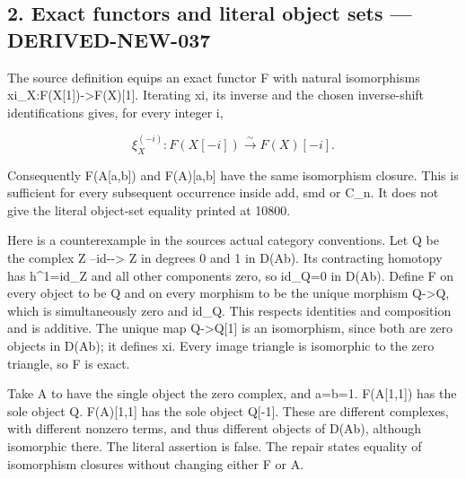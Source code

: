\subsection{2. Exact functors and literal object sets --- DERIVED-NEW-037}\label{proofs-10691-11108-exact-functors-and-literal-object-sets-derived-new-037}

The source definition equips an exact functor F with natural isomorphisms xi\_\allowbreak{}X:\allowbreak{}F(X[1]\allowbreak{})\allowbreak{}\allowbreak{}->F(X)\allowbreak{}[1]\allowbreak{}. Iterating xi,\allowbreak{} its inverse and the chosen inverse-shift identifications gives,\allowbreak{} for every integer i,\allowbreak{}

\[
 \xi_X^{(-i)}:F(X[-i])\xrightarrow{\sim}F(X)[-i].
\]

Consequently F(A[a,\allowbreak{}b]\allowbreak{})\allowbreak{} and F(A)\allowbreak{}[a,\allowbreak{}b]\allowbreak{} have the same isomorphism closure. This is sufficient for every subsequent occurrence inside add,\allowbreak{} smd or C\_\allowbreak{}n. It does not give the literal object-set equality printed at 10800.

Here is a counterexample in the source\textquotesingle s actual category conventions. Let Q be the complex Z --id-\allowbreak{}-> Z in degrees 0 and 1 in D(Ab)\allowbreak{}. Its contracting homotopy has h\textasciicircum{}1\allowbreak{}=id\_\allowbreak{}Z and all other components zero,\allowbreak{} so id\_\allowbreak{}Q\allowbreak{}=0 in D(Ab)\allowbreak{}. Define F on every object to be Q and on every morphism to be the unique morphism Q\allowbreak{}->Q,\allowbreak{} which is simultaneously zero and id\_\allowbreak{}Q. This respects identities and composition and is additive. The unique map Q\allowbreak{}->Q[1]\allowbreak{} is an isomorphism,\allowbreak{} since both are zero objects in D(Ab)\allowbreak{}; it defines xi. Every image triangle is isomorphic to the zero triangle,\allowbreak{} so F is exact.

Take A to have the single object the zero complex,\allowbreak{} and a\allowbreak{}=b\allowbreak{}=1. F(A[1,\allowbreak{}1]\allowbreak{})\allowbreak{} has the sole object Q. F(A)\allowbreak{}[1,\allowbreak{}1]\allowbreak{} has the sole object Q[-1]\allowbreak{}. These are different complexes,\allowbreak{} with different nonzero terms,\allowbreak{} and thus different objects of D(Ab)\allowbreak{},\allowbreak{} although isomorphic there. The literal assertion is false. The repair states equality of isomorphism closures without changing either F or A.

